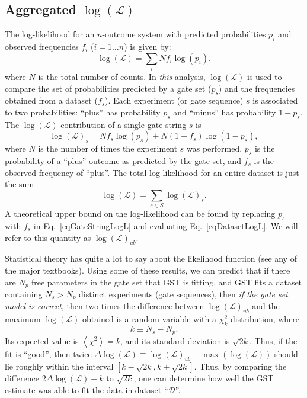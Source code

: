 \documentclass{article}[11pt]
\newcommand{\expec}[1]{\ensuremath{\left\langle#1\right\rangle}}
\begin{document}
\subsection{Aggregated $\log(\mathcal{L})$}

The log-likelihood for an $n$-outcome system with predicted probabilities $p_i$ and observed frequencies $f_i$ ($i=1\ldots n$) is given by:
\begin{equation}
\log(\mathcal{L}) = \sum_i N f_i \log(p_i).
\end{equation}
where $N$ is the total number of counts. In \emph{this} analysis, $\log(\mathcal{L})$ is used to compare the set of probabilities predicted by a gate set ($p_s$) and the frequencies obtained from a dataset ($f_s$).  Each experiment (or gate sequence) $s$ is associated to two probabilities:  ``plus'' has probability $p_s$ and ``minus'' has probability $1-p_s$.  The $\log(\mathcal{L})$ contribution of a single gate string $s$ is
\begin{equation}
\log(\mathcal{L})_s = N f_s \log(p_s) + N (1-f_s) \log(1-p_s),\label{eqGateStringLogL}
\end{equation}
where $N$ is the number of times the experiment $s$ was performed, $p_s$ is the probability of a ``plus'' outcome as predicted by the gate set, and $f_s$ is the observed frequency of ``plus''.  The total log-likelihood for an entire dataset is just the sum 
\begin{equation}
\log(\mathcal{L}) = \sum_{s\in\mathcal{S}}{ \log(\mathcal{L})_s}.\label{eqDatasetLogL}
\end{equation}
A theoretical upper bound on the log-likelihood can be found by replacing $p_s$ with $f_s$ in Eq.~\ref{eqGateStringLogL} and evaluating Eq.~\ref{eqDatasetLogL}.  We will refer to this quantity as $\log(\mathcal{L})_{ub}$.

Statistical theory has quite a lot to say about the likelihood function (see any of the major textbooks).  Using some of these results, we can predict that if there are $N_p$ free parameters in the gate set that GST is fitting, and GST fits a dataset containing $N_s > N_p$ distinct experiments (gate sequences), then \emph{if the gate set model is correct}, then two times the difference between $\log(\mathcal{L})_{ub}$ and the maximum $\log(\mathcal{L})$ obtained is a random variable with a $\chi^2_{k}$ distribution, where 
$$k \equiv N_s - N_p.$$
Its expected value is $\expec{\chi^2}=k$, and its standard deviation is $\sqrt{2k}$.  Thus, if the fit is ``good'', then twice $\Delta\log(\mathcal{L}) \equiv \log(\mathcal{L})_{ub} - \max(\log(\mathcal{L}))$ should lie roughly within the interval $[k-\sqrt{2k},k+\sqrt{2k}]$.
Thus, by comparing the difference $2\Delta\log(\mathcal{L}) - k$ to $\sqrt{2k}$, one can determine how well the GST estimate was able to fit the data in dataset ``$\mathcal{D}$''.
\end{document}
